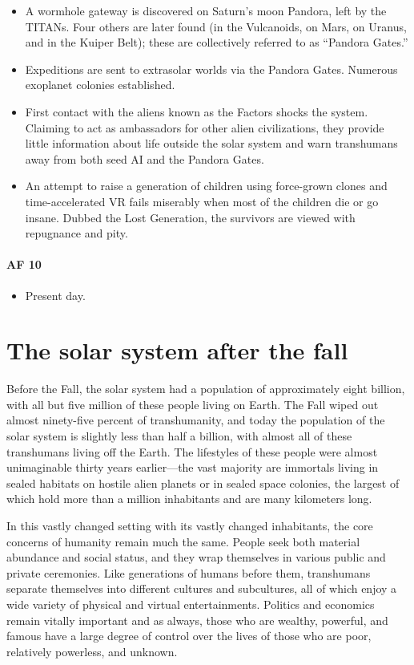\begin{itemize}
\item A wormhole gateway is discovered on Saturn's moon Pandora, left
  by the TITANs.  Four others are later found (in the Vulcanoids, on
  Mars, on Uranus, and in the Kuiper Belt); these are collectively
  referred to as ``Pandora Gates.''
\item Expeditions are sent to extrasolar worlds via the Pandora
  Gates. Numerous exoplanet colonies established.
\item First contact with the aliens known as the Factors shocks the
  system. Claiming to act as ambassadors for other alien
  civilizations, they provide little information about life outside
  the solar system and warn transhumans away from both seed AI and the
  Pandora Gates.
\item An attempt to raise a generation of children using force-grown
  clones and time-accelerated VR fails miserably when most of the
  children die or go insane.  Dubbed the Lost Generation, the
  survivors are viewed with repugnance and pity.
\end{itemize}
  
\paragraph{AF 10}
  
\begin{itemize}
\item Present day.
\end{itemize}

\section{The solar system after the fall}
\label{sec:solar-system-after}

Before the Fall, the solar system had a population of approximately
eight billion, with all but five million of these people living on
Earth. The Fall wiped out almost ninety-five percent of transhumanity,
and today the population of the solar system is slightly less than
half a billion, with almost all of these transhumans living off the
Earth. The lifestyles of these people were almost unimaginable thirty
years earlier—the vast majority are immortals living in sealed
habitats on hostile alien planets or in sealed space colonies, the
largest of which hold more than a million inhabitants and are many
kilometers long.

In this vastly changed setting with its vastly changed inhabitants,
the core concerns of humanity remain much the same. People seek both
material abundance and social status, and they wrap themselves in
various public and private ceremonies. Like generations of humans
before them, transhumans separate themselves into different cultures
and subcultures, all of which enjoy a wide variety of physical and
virtual entertainments. Politics and economics remain vitally
important and as always, those who are wealthy, powerful, and famous
have a large degree of control over the lives of those who are poor,
relatively powerless, and unknown.

